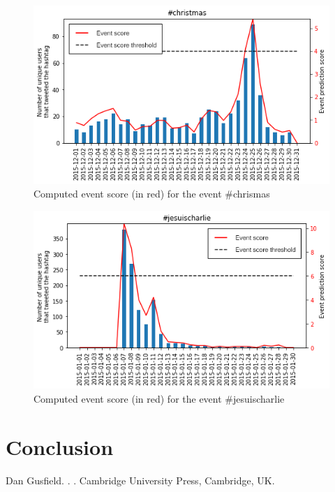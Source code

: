\documentclass[11pt]{article}
\begin{document}
\begin{figure}[htbp]
  \vspace*{-1mm}
  \centering
  \includegraphics[width=\columnwidth]{figures/christmas_result.png}
  \vspace{-5mm}
  \caption{Computed event score (in red) for the event \#chrismas}
  \label{fig:christmas}
\end{figure}

\begin{figure}[htbp]
  \vspace*{-1mm}
  \centering
  \includegraphics[width=\columnwidth]{figures/jesuischarlie_result.png}
  \vspace{-5mm}
  \caption{Computed event score (in red) for the event \#jesuischarlie}
  \label{fig:jesuischarlie}
\end{figure}



\section{Conclusion}

\begin{thebibliography}{}

Dan Gusfield.
.
.
\newblock Cambridge University Press, Cambridge, UK.

\end{thebibliography}
\end{document}
